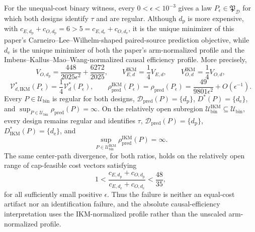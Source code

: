 For the unequal-cost binary witness, every \(0<\epsilon<10^{-3}\) gives a law \(P_\epsilon\in\mathfrak P_{\mathcal D}\) for which both designs identify \(\tau\) and are regular. Although \(d_{\mathrm p}\) is more expensive, with \(c_{E,d_{\mathrm p}}+c_{O,d_{\mathrm p}}=6>5=c_{E,d_{\mathrm e}}+c_{O,d_{\mathrm e}}\), it is the unique minimizer of this paper's Carneiro--Lee--Wilhelm-shaped paired-source prediction objective, while \(d_{\mathrm e}\) is the unique minimizer of both the paper's arm-normalized profile and the Imbens--Kallus--Mao--Wang-normalized causal efficiency profile. More precisely,
\[
 V_{O,d_{\mathrm p}}=\frac{448}{2025\epsilon^2}+\frac{6272}{2025},
 \qquad
 V_{E,d}^{\mathrm{IKM}}=\frac14V_{E,d},
 \qquad
 V_{O,d}^{\mathrm{IKM}}=\frac14V_{O,d},
\]
\[
 \mathcal V_{d,\mathrm{IKM}}^*(P_\epsilon)
 =\frac14\mathcal V_d^*(P_\epsilon),
 \qquad
 \rho_{\mathrm{pred}}^{\mathrm{IKM}}(P_\epsilon)
 =\rho_{\mathrm{pred}}(P_\epsilon)
 =\frac{49}{9801\epsilon^2}+O(\epsilon^{-1}).
\]
Every \(P\in\mathcal U_{\mathrm{bin}}\) is regular for both designs, \(\mathcal D_{\mathrm{pred}}(P)=\{d_{\mathrm p}\}\), \(D^*(P)=\{d_{\mathrm e}\}\), and \(\sup_{P\in\mathcal U_{\mathrm{bin}}}\rho_{\mathrm{pred}}(P)=\infty\). On the relatively open subregion \(\mathcal U_{\mathrm{bin}}^{\mathrm{IKM}}\subseteq\mathcal U_{\mathrm{bin}}\), every design remains regular and identifies \(\tau\), \(\mathcal D_{\mathrm{pred}}(P)=\{d_{\mathrm p}\}\), \(D_{\mathrm{IKM}}^*(P)=\{d_{\mathrm e}\}\), and
\[
 \sup_{P\in\mathcal U_{\mathrm{bin}}^{\mathrm{IKM}}}
 \rho_{\mathrm{pred}}^{\mathrm{IKM}}(P)=\infty.
\]
The same center-path divergence, for both ratios, holds on the relatively open range of cap-feasible cost vectors satisfying
\[
 1<\frac{c_{E,d_{\mathrm p}}+c_{O,d_{\mathrm p}}}
 {c_{E,d_{\mathrm e}}+c_{O,d_{\mathrm e}}}<\frac{48}{35},
\]
for all sufficiently small positive \(\epsilon\). Thus the failure is neither an equal-cost artifact nor an identification failure, and the absolute causal-efficiency interpretation uses the IKM-normalized profile rather than the unscaled arm-normalized profile.